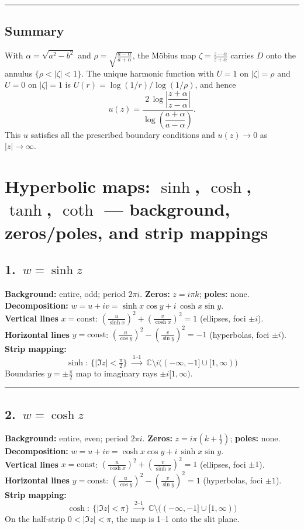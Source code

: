\documentclass[11pt]{article}
\begin{document}
	\bigskip\hrule\bigskip
	
	\subsection*{Summary}
	With $\alpha=\sqrt{a^{2}-b^{2}}$ and $\displaystyle \rho=\sqrt{\frac{a-\alpha}{a+\alpha}}$,
	the Möbius map $\displaystyle \zeta=\frac{z-\alpha}{z+\alpha}$ carries
	$D$ onto the annulus $\{\rho<|\zeta|<1\}$.
	The unique harmonic function with $U=1$ on $|\zeta|=\rho$ and $U=0$ on $|\zeta|=1$
	is $U(r)=\log(1/r)/\log(1/\rho)$, and hence
	\[
	u(z)=\frac{2\,\log\!\left|\dfrac{z+\alpha}{z-\alpha}\right|}
	{\log\!\left(\dfrac{a+\alpha}{a-\alpha}\right)}.
	\]
	This $u$ satisfies all the prescribed boundary conditions and $u(z)\to 0$ as $|z|\to\infty$.
	

\section*{Hyperbolic maps: $\sinh$, $\cosh$, $\tanh$, $\coth$ — background, zeros/poles, and strip mappings}

\subsection*{1.\ $w=\sinh z$}
\textbf{Background:} entire, odd; period $2\pi i$. \quad
\textbf{Zeros:} $z=i\pi k$; \textbf{poles:} none.\\
\textbf{Decomposition: } $w=u+iv=\sinh x\cos y + i\,\cosh x\sin y$.\\
\textbf{Vertical lines } $x=\text{const}$: $\left(\frac{u}{\sinh x}\right)^2+\left(\frac{v}{\cosh x}\right)^2=1$ (ellipses, foci $\pm i$).\\
\textbf{Horizontal lines } $y=\text{const}$: $\left(\frac{u}{\cos y}\right)^2-\left(\frac{v}{\sin y}\right)^2=-1$ (hyperbolas, foci $\pm i$).\\
\textbf{Strip mapping:}
\[
\boxed{\,\sinh:\ \{|\Im z|<\tfrac{\pi}{2}\}\ \xrightarrow{\ 1\text{--}1\ }\ \mathbb C\setminus i\big((-\infty,-1]\cup[1,\infty)\big)\,}
\]
Boundaries $y=\pm\frac{\pi}{2}$ map to imaginary rays $\pm i[1,\infty)$.

\bigskip\hrule\bigskip

\subsection*{2.\ $w=\cosh z$}
\textbf{Background:} entire, even; period $2\pi i$. \quad
\textbf{Zeros:} $z=i\pi(k+\frac12)$; \textbf{poles:} none.\\
\textbf{Decomposition: } $w=u+iv=\cosh x\cos y + i\,\sinh x\sin y$.\\
\textbf{Vertical lines } $x=\text{const}$: $\left(\frac{u}{\cosh x}\right)^2+\left(\frac{v}{\sinh x}\right)^2=1$ (ellipses, foci $\pm1$).\\
\textbf{Horizontal lines } $y=\text{const}$: $\left(\frac{u}{\cos y}\right)^2-\left(\frac{v}{\sin y}\right)^2=1$ (hyperbolas, foci $\pm1$).\\
\textbf{Strip mapping:}
\[
\boxed{\,\cosh:\ \{|\Im z|<\pi\}\ \xrightarrow{\ 2\text{--}1\ }\ \mathbb C\setminus\big((-\infty,-1]\cup[1,\infty)\big)\,}
\]
On the half-strip $0<|\Im z|<\pi$, the map is 1--1 onto the slit plane.
\end{document}
